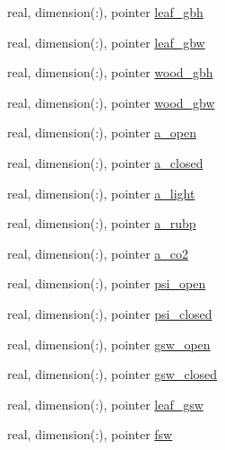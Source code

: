 \begin{DoxyCompactItemize}
\item 
real, dimension(\+:), pointer \hyperlink{structed__state__vars_1_1patchtype_ade937744d74fd71b2a832db55c4543cd}{leaf\+\_\+gbh}
\item 
real, dimension(\+:), pointer \hyperlink{structed__state__vars_1_1patchtype_a436a56f82c6be0710bdc6d0ab9d3c605}{leaf\+\_\+gbw}
\item 
real, dimension(\+:), pointer \hyperlink{structed__state__vars_1_1patchtype_ac312a2fe1c1b93c7ed35f26d0b68857c}{wood\+\_\+gbh}
\item 
real, dimension(\+:), pointer \hyperlink{structed__state__vars_1_1patchtype_ac21bbb8a43cf6b2bf89ebfe00928fb69}{wood\+\_\+gbw}
\item 
real, dimension(\+:), pointer \hyperlink{structed__state__vars_1_1patchtype_ad711f51f421bb361f95f288c0740e3f5}{a\+\_\+open}
\item 
real, dimension(\+:), pointer \hyperlink{structed__state__vars_1_1patchtype_a285ae1ef0231913023b00bca3f89f901}{a\+\_\+closed}
\item 
real, dimension(\+:), pointer \hyperlink{structed__state__vars_1_1patchtype_a672b64dadd4e7421d56daf7133a818b7}{a\+\_\+light}
\item 
real, dimension(\+:), pointer \hyperlink{structed__state__vars_1_1patchtype_a2db59596c8dd4b7de8367a0533bfdde6}{a\+\_\+rubp}
\item 
real, dimension(\+:), pointer \hyperlink{structed__state__vars_1_1patchtype_a898793715bc6af7d57e87fce60a2a476}{a\+\_\+co2}
\item 
real, dimension(\+:), pointer \hyperlink{structed__state__vars_1_1patchtype_a0644f2cb18662932c28ecff53c89d3bc}{psi\+\_\+open}
\item 
real, dimension(\+:), pointer \hyperlink{structed__state__vars_1_1patchtype_a37e1a5a8e68d7fe3b54af4ee5ac0c5b6}{psi\+\_\+closed}
\item 
real, dimension(\+:), pointer \hyperlink{structed__state__vars_1_1patchtype_a37e240729c7cccd40baea6614474fec9}{gsw\+\_\+open}
\item 
real, dimension(\+:), pointer \hyperlink{structed__state__vars_1_1patchtype_aa31de141e52bf3e309fd414b600218ee}{gsw\+\_\+closed}
\item 
real, dimension(\+:), pointer \hyperlink{structed__state__vars_1_1patchtype_a9196838a87800383511f2b5a810667cd}{leaf\+\_\+gsw}
\item 
real, dimension(\+:), pointer \hyperlink{structed__state__vars_1_1patchtype_adf23a671b2d56e76c3cf06aa79103c2f}{fsw}
\item 

\end{DoxyCompactItemize}
